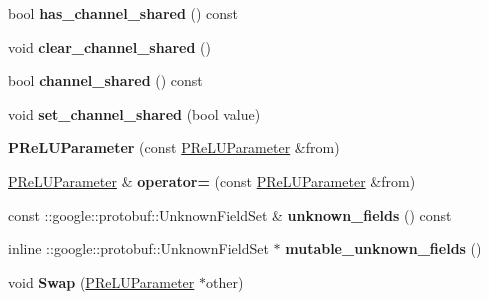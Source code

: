 \begin{DoxyCompactItemize}
bool {\bfseries has\+\_\+channel\+\_\+shared} () const
\item 
\mbox{\label{classcaffe_1_1_p_re_l_u_parameter_aa567336b14b85320f2d652123cba9f56}} 
void {\bfseries clear\+\_\+channel\+\_\+shared} ()
\item 
\mbox{\label{classcaffe_1_1_p_re_l_u_parameter_a56a708a37000cbb87536ca9a0be7e375}} 
bool {\bfseries channel\+\_\+shared} () const
\item 
\mbox{\label{classcaffe_1_1_p_re_l_u_parameter_af0482ada818ef9ec460073fa86936fb8}} 
void {\bfseries set\+\_\+channel\+\_\+shared} (bool value)
\item 
\mbox{\label{classcaffe_1_1_p_re_l_u_parameter_a94f0a1d6dae698c9b84e41fd3c71f075}} 
{\bfseries P\+Re\+L\+U\+Parameter} (const \mbox{\hyperlink{classcaffe_1_1_p_re_l_u_parameter}{P\+Re\+L\+U\+Parameter}} \&from)
\item 
\mbox{\label{classcaffe_1_1_p_re_l_u_parameter_ac7c8a2639cabaa7d07ecce8971c7b609}} 
\mbox{\hyperlink{classcaffe_1_1_p_re_l_u_parameter}{P\+Re\+L\+U\+Parameter}} \& {\bfseries operator=} (const \mbox{\hyperlink{classcaffe_1_1_p_re_l_u_parameter}{P\+Re\+L\+U\+Parameter}} \&from)
\item 
\mbox{\label{classcaffe_1_1_p_re_l_u_parameter_a430a32608158ae45353f4eed42ce9ed2}} 
const \+::google\+::protobuf\+::\+Unknown\+Field\+Set \& {\bfseries unknown\+\_\+fields} () const
\item 
\mbox{\label{classcaffe_1_1_p_re_l_u_parameter_a021825d4075f11734b4758062ef7259b}} 
inline \+::google\+::protobuf\+::\+Unknown\+Field\+Set $\ast$ {\bfseries mutable\+\_\+unknown\+\_\+fields} ()
\item 
\mbox{\label{classcaffe_1_1_p_re_l_u_parameter_a6882c8d80415be68220e48bb3797d11b}} 
void {\bfseries Swap} (\mbox{\hyperlink{classcaffe_1_1_p_re_l_u_parameter}{P\+Re\+L\+U\+Parameter}} $\ast$other)
\item 
\mbox{\label{classcaffe_1_1_p_re_l_u_parameter_aadfed328830ba21ccb09df8e88b5ab90}} 

\end{DoxyCompactItemize}

